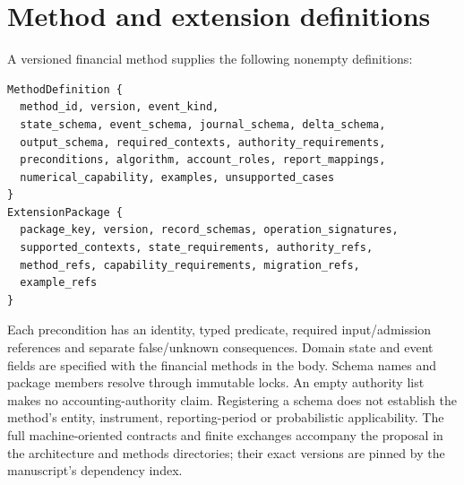\section{Method and extension definitions}

A versioned financial method supplies the following nonempty definitions:
\begin{lstlisting}
MethodDefinition {
  method_id, version, event_kind,
  state_schema, event_schema, journal_schema, delta_schema,
  output_schema, required_contexts, authority_requirements,
  preconditions, algorithm, account_roles, report_mappings,
  numerical_capability, examples, unsupported_cases
}
ExtensionPackage {
  package_key, version, record_schemas, operation_signatures,
  supported_contexts, state_requirements, authority_refs,
  method_refs, capability_requirements, migration_refs,
  example_refs
}
\end{lstlisting}
Each precondition has an identity, typed predicate, required input/admission
references and separate false/unknown consequences. Domain state and event
fields are specified with the financial methods in the body. Schema names and
package members resolve through immutable locks. An empty authority list makes
no accounting-authority claim. Registering a schema does not establish the
method's entity, instrument, reporting-period or probabilistic applicability.
The full machine-oriented contracts and finite exchanges accompany the proposal
in the architecture and methods directories; their exact versions are pinned
by the manuscript's dependency index.


